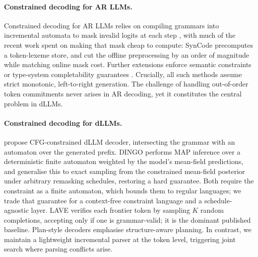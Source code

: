 \documentclass{article}
\begin{document}
\paragraph{Constrained decoding for AR LLMs.}
Constrained decoding for AR LLMs relies on compiling grammars into incremental automata to mask invalid logits at each step \citep{outlines, dong2024xgrammar, microsoft2025llguidance}, with much of the recent work spent on making that mask cheap to compute: SynCode \citep{ugare2025syncode} precomputes a token-lexeme store, and \citet{park2025flexible} cut the offline preprocessing by an order of magnitude while matching online mask cost. Further extensions enforce semantic constraints \citep{poesia2022synchromesh} or type-system completability guarantees \citep{muendler2025typeconstrained}. Crucially, all such methods assume strict monotonic, left-to-right generation. The challenge of handling out-of-order token commitments never arises in AR decoding, yet it constitutes the central problem in dLLMs.

\paragraph{Constrained decoding for dLLMs.}
\citet{cd4dllm} propose CFG-constrained dLLM decoder, intersecting the
grammar with an automaton over the generated prefix. DINGO
\citep{suresh2025dingoconstrainedinferencediffusion} performs MAP inference over
a deterministic finite automaton weighted by the model's mean-field predictions,
and \citet{dang2026fadllm} generalise this to exact sampling from the
constrained mean-field posterior under arbitrary remasking schedules, restoring
a hard guarantee. Both require the constraint as a finite automaton, which
bounds them to regular languages; we trade that guarantee for a context-free
constraint language and a schedule-agnostic layer. LAVE
\citep{zhang2026lookaheadthenverifyreliableconstraineddecoding} verifies each
frontier token by sampling $K$ random completions, accepting only if one is
grammar-valid; it is the dominant published baseline. Plan-style decoders
\citep{li2026planverifyfillstructured} emphasise structure-aware planning. In contrast, we maintain a lightweight incremental parser at the token level, triggering joint search where parsing conflicts arise.
\end{document}

